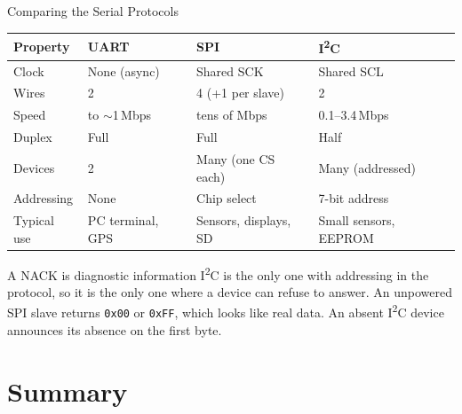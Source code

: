 \documentclass[9pt,aspectratio=169,xcolor=table]{beamer}
\begin{document}
\begin{frame}{Comparing the Serial Protocols}
    \begin{center}
    {\small
    \striped
    \begin{tabular}{@{}l l l l@{}}
        \toprule
        \textbf{Property} & \textbf{UART} & \textbf{SPI} & \textbf{I\textsuperscript{2}C} \\
        \midrule
        Clock & None (async) & Shared SCK & Shared SCL \\
        Wires & 2 & 4 (+1 per slave) & 2 \\
        Speed & to $\sim$1\,Mbps & tens of Mbps & 0.1--3.4\,Mbps \\
        Duplex & Full & Full & Half \\
        Devices & 2 & Many (one CS each) & Many (addressed) \\
        Addressing & None & Chip select & 7-bit address \\
        Typical use & PC terminal, GPS & Sensors, displays, SD & Small sensors, EEPROM \\
        \bottomrule
    \end{tabular}}
    \end{center}

    \vspace{3mm}
    \begin{block}{A NACK is diagnostic information}
        {\small I\textsuperscript{2}C is the only one with \alert{addressing in the protocol}, so it is the only one where a device can refuse to answer. An unpowered SPI slave returns \texttt{0x00} or \texttt{0xFF}, which looks like real data. An absent I\textsuperscript{2}C device announces its absence on the first byte.}
    \end{block}
\end{frame}


\section{Summary}
\end{document}
